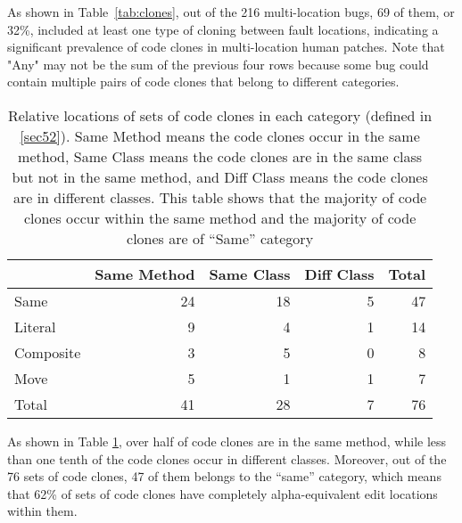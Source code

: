 \documentclass[sigconf, timestamp-false, anonymous=true]{acmart}
\begin{document}
As shown in Table~\ref{tab:clones}, out of the 216 multi-location bugs,
69 of them, or  32\%, included at least one type of cloning between fault locations, indicating a 
significant 
prevalence of code clones in multi-location human patches.
Note that "Any" may not
be the sum of the previous four rows because some bug could contain multiple pairs of code clones 
that
belong to different categories.


\begin{table}
{\begin{center}
\begin{tabular} {lrrrr}
\toprule
& Same Method & Same Class & Diff Class & Total\\
\hline
Same & 24 & 18 & 5 & 47 \\ 
Literal & 9 & 4 & 1 & 14 \\
Composite & 3 & 5 & 0 & 8 \\
Move & 5 & 1 & 1 & 7 \\
\midrule
Total & 41 & 28 & 7  & 76\\
\bottomrule
\end{tabular}
\end{center}
}
\caption{
    Relative locations of sets of code clones in each category (defined in \ref{sec52}).
Same Method means the code clones occur in the same method, Same Class means the code
clones are in the same class but not in the same method, and Diff Class means the
code clones are in different classes.
This table shows that the majority of code clones occur within the same method
and the majority of code clones are of ``Same'' category}
\label{tab:clones_loc}
\end{table}

As shown in Table \ref{tab:clones_loc}, over half of code clones are in the same method, while less than
one tenth of the code clones occur in different classes. Moreover, out of the 76 sets of code clones,
47 of them belongs to the ``same'' category, which means that 62\% of sets of code clones have completely
alpha-equivalent edit locations within them.
\end{document}
